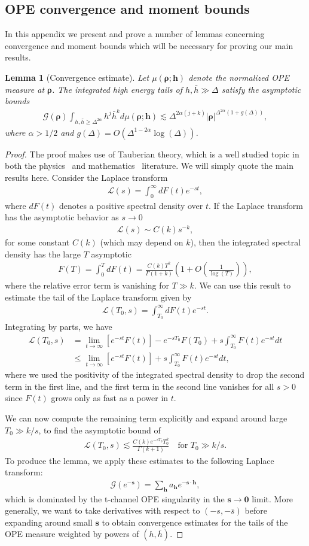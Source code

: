 \documentclass[a4paper,11pt]{article}
\theoremstyle{plain}
\newtheorem{lem}[thm]{Lemma}
\theoremstyle{definition}
\theoremstyle{remark}
\newcommand{\bs}[1]{\boldsymbol{#1}}
\newcommand{\bh}{{\bar{h}}}
\newcommand{\ba}{\begin{equation} \begin{aligned}}
\newcommand{\ea}{\end{aligned} \end{equation}}
\newcommand{\De}{\Delta}
\begin{document}
\begin{appendix}
\section{OPE convergence and moment bounds}
\label{convergence}
In this appendix we present and prove a number of lemmas concerning convergence and moment bounds which will be necessary for proving our main results.


\begin{lem}[Convergence estimate]
\label{convestimate}
Let $\mu(\bs{\rho};\bs{h})$ denote the normalized OPE measure at $\bs{\rho}$. The integrated high energy tails of $h,\bh \gg \De$ satisfy the asymptotic bounds
\ba
\mathcal{G}(\bs{\rho})\int_{ h,\bh \geq \De^{2\alpha}} h^j \bh^k d\mu(\bs{\rho}; \bs{h}) \lesssim\De^{2\alpha(j+k)} |\bs{\rho}|^{\De^{2\alpha} ( 1 + g(\De) ) },
\ea
where $\alpha >1/2$ and $g(\De) = O(\De^{1-2\alpha}\log(\De))$.
\end{lem}
\begin{proof}
    The proof makes use of Tauberian theory, which is a well studied topic in both the physics~\cite{Qiao:2017xif,Mukhametzhanov:2018zja,vanRees:2024xkb} and mathematics~\cite{Korevaar2004} literature. We will simply quote the main results here. Consider the Laplace transform
    \ba
\mathcal{L}(s) = \int_0^\infty dF(t) e^{-s t},
    \ea
    where $dF(t)$ denotes a positive spectral density over $t$. If the Laplace transform has the asymptotic behavior as $s \to 0$
    \ba
    \mathcal{L}(s) \sim C(k) s^{-k},
    \ea
    for some constant $C(k)$ (which may depend on $k$), then the integrated spectral density has the large $T$ asymptotic
    \ba
    F(T) = \int_0^T dF(t) = \frac{C(k) T^k}{\Gamma(1+k)}\left( 1 + O\left( \frac{1}{\log(T)}\right) \right),
    \ea
    where the relative error term is vanishing for $T \gg k$. We can use this result to estimate the tail of the Laplace transform given by
    \ba
\mathcal{L}(T_0,s) = \int_{T_0}^\infty dF(t) e^{-s t}.
\ea
Integrating by parts, we have
\ba
\mathcal{L}(T_0,s) &=\lim_{t\to\infty} \left[e^{-s t}F(t)\right] - e^{-s T_0} F(T_0) + s \int_{T_0}^
\infty F(t) e^{-s t} dt\\
&\leq\lim_{t\to\infty} \left[e^{-s t}F(t)\right] + s \int_{T_0}^
\infty F(t) e^{-s t} dt,
\ea
where we used the positivity of the integrated spectral density to drop the second term in the first line, and the first term in the second line vanishes for all $s>0$ since $F(t)$ grows only as fast as a power in $t$. 

We can now compute the remaining term explicitly and expand around large $T_0 \gg k/s$, to find the asymptotic bound of
\ba
\mathcal{L}(T_0,s)  \lesssim \frac{C(k) e^{-s T_0} T_0^k}{\Gamma(k+1)} \quad \text{for  } T_0 \gg k/s.
\ea
To produce the lemma, we apply these estimates to the following Laplace transform:
\ba
\mathcal{G}(e^{-\bs{s}}) = \sum_{\bs{h}} a_{\bs{h}} e^{-\bs{s}\cdot \bs{h}},
\ea
which is dominated by the t-channel OPE singularity in the $\bs{s} \to \bs{0}$ limit. More generally, we want to take derivatives with respect to $(-s,-\bar{s})$ before expanding around small $\bs{s}$ to obtain convergence estimates for the tails of the OPE measure weighted by powers of $(h,\bar{h})$. 


\end{proof}
\end{appendix}
\end{document}
